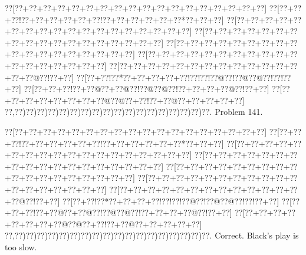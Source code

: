 \documentclass[a5paper]{article}
\begin{document}
\newpage
\begin{center}
{\goo
\0??[\0??+\0??+\0??+\0??+\0??+\0??+\0??+\0??+\0??+\0??+\0??+\0??+\0??+\0??+\0??+\0??+\0??+\0??]
\0??[\0??+\0??+\0??!\0??+\0??+\0??+\0??+\0??+\0??!\0??+\0??+\0??+\0??+\0??+\0??*\0??+\0??+\0??]
\0??[\0??+\0??+\0??+\0??+\0??+\0??+\0??+\0??+\0??+\0??+\0??+\0??+\0??+\0??+\0??+\0??+\0??+\0??]
\0??[\0??+\0??+\0??+\0??+\0??+\0??+\0??+\0??+\0??+\0??+\0??+\0??+\0??+\0??+\0??+\0??+\0??+\0??]
\0??[\0??+\0??+\0??+\0??+\0??+\0??+\0??+\0??+\0??+\0??+\0??+\0??+\0??+\0??+\0??+\0??+\0??+\0??]
\0??[\0??+\0??+\0??+\0??+\0??+\0??+\0??+\0??+\0??+\0??+\0??+\0??+\0??+\0??+\0??+\0??+\0??+\0??]
\0??[\0??+\0??+\0??+\0??+\0??+\0??+\0??+\0??+\0??+\0??+\0??+\0??+\0??+\0??+\0??@\0??!\0??+\0??]
\0??[\0??+\0??!\0??*\0??+\0??+\0??+\0??+\0??!\0??!\0??!\0??@\0??!\0??@\0??@\0??!\0??!\0??+\0??]
\0??[\0??+\0??+\0??!\0??+\0??@\0??+\0??@\0??!\0??@\0??@\0??!\0??+\0??+\0??+\0??@\0??!\0??+\0??]
\0??[\0??+\0??+\0??+\0??+\0??+\0??+\0??+\0??@\0??@\0??+\0??!\0??+\0??@\0??+\0??+\0??+\0??+\0??]
\0??,\0??)\0??)\0??)\0??)\0??)\0??)\0??)\0??)\0??)\0??)\0??)\0??)\0??)\0??)\0??)\0??)\0??)\0??.
}
Problem 141.

\end{center}
\begin{center}
{\goo
\0??[\0??+\0??+\0??+\0??+\0??+\0??+\0??+\0??+\0??+\0??+\0??+\0??+\0??+\0??+\0??+\0??+\0??+\0??]
\0??[\0??+\0??+\0??!\0??+\0??+\0??+\0??+\0??+\0??!\0??+\0??+\0??+\0??+\0??+\0??*\0??+\0??+\0??]
\0??[\0??+\0??+\0??+\0??+\0??+\0??+\0??+\0??+\0??+\0??+\0??+\0??+\0??+\0??+\0??+\0??+\0??+\0??]
\0??[\0??+\0??+\0??+\0??+\0??+\0??+\0??+\0??+\0??+\0??+\0??+\0??+\0??+\0??+\0??+\0??+\0??+\0??]
\0??[\0??+\0??+\0??+\0??+\0??+\0??+\0??+\0??+\0??+\0??+\0??+\0??+\0??+\0??+\0??+\0??+\0??+\0??]
\0??[\0??+\0??+\0??+\0??+\0??+\0??+\0??+\0??+\0??+\0??+\0??+\0??+\0??+\0??+\0??+\0??+\0??+\0??]
\0??[\0??+\0??+\0??+\0??+\0??+\0??+\0??+\0??+\0??+\0??+\0??+\0??+\0??+\0??@\0??!\0??+\0??]
\0??[\0??+\0??!\0??*\0??+\0??+\0??+\0??!\0??!\0??!\0??@\0??!\0??@\0??@\0??!\0??!\0??+\0??]
\0??[\0??+\0??+\0??!\0??+\0??@\0??+\0??@\0??!\0??@\0??@\0??!\0??+\0??+\0??+\0??@\0??!\0??+\0??]
\0??[\0??+\0??+\0??+\0??+\0??+\0??+\0??+\0??@\0??@\0??+\0??!\0??+\0??@\0??+\0??+\0??+\0??+\0??]
\0??,\0??)\0??)\0??)\0??)\0??)\0??)\0??)\0??)\0??)\0??)\0??)\0??)\0??)\0??)\0??)\0??)\0??)\0??.
}
Correct. Black's play is too slow.

\end{center}
\end{document}
